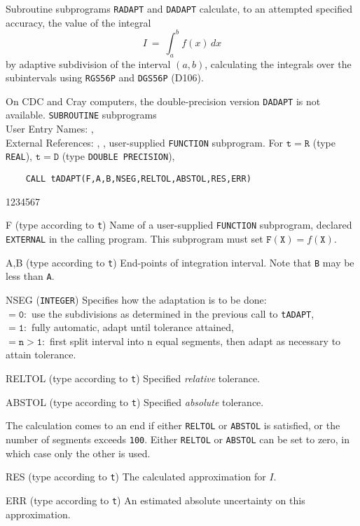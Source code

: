                                 
                          
\Submitter{}                               
Subroutine subprograms {\tt RADAPT} and {\tt DADAPT} calculate, to
an attempted specified accuracy, the value of the integral
$$I \ = \ \int_a^b f(x)\,dx$$
by adaptive subdivision of the interval $(a,b)$, calculating the
integrals over the subintervals using {\tt RGS56P} and
{\tt DGS56P} (D106).
\par
On CDC and Cray computers, the double-precision version {\tt DADAPT}
is not available.
\Structure
{\tt SUBROUTINE} subprograms \\
User Entry Names: ,  \\
External References: , ,
user-supplied {\tt FUNCTION} subprogram.
\Usage
For $\mathtt{t=R}$ (type {\tt REAL}), $\mathtt{t=D}$ (type
{\tt DOUBLE PRECISION}),
\begin{verbatim}
    CALL tADAPT(F,A,B,NSEG,RELTOL,ABSTOL,RES,ERR)
\end{verbatim}
\begin{DLtt}{1234567}
\item[F]
(type according to {\tt t}) Name of a user-supplied
{\tt FUNCTION} subprogram, declared {\tt EXTERNAL} in the calling
program. This subprogram must set $\mathtt{F(X)} = f(\mathtt{X})$.
\item[A,B] (type according to {\tt t}) End-points of integration
interval. Note that {\tt B} may be less than {\tt A}.
\item[NSEG] ({\tt INTEGER}) Specifies how the adaptation is to
be done: \\
$\mathtt{= 0:}$ use the subdivisions as determined in the previous
call to {\tt tADAPT}, \\
$\mathtt{= 1:}$ fully automatic, adapt until tolerance attained, \\
$\mathtt{= n>1:}$ first split interval into n equal segments,
              then adapt as necessary to attain tolerance.
\item[RELTOL] (type according to {\tt t})
Specified {\it relative} tolerance.
\item[ABSTOL] (type according to {\tt t})
Specified {\it absolute} tolerance.
\item[]  The calculation comes to an end if either {\tt RELTOL} or
{\tt ABSTOL} is satisfied, or the number of segments exceeds {\tt 100}.
Either {\tt RELTOL} or {\tt ABSTOL} can be set to zero, in which
case only the other is used.
\item[RES] (type according to {\tt t}) The calculated approximation
for $I$.
\item[ERR] (type according to {\tt t}) An estimated absolute
uncertainty on this approximation.
\end{DLtt}
